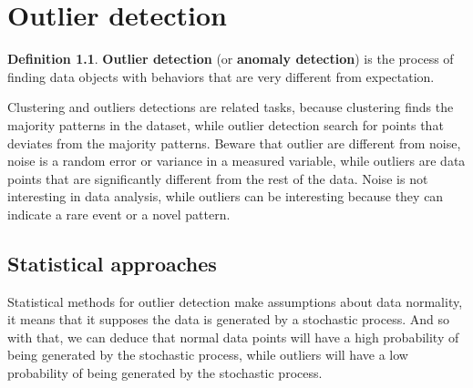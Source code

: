 \documentclass[12pt, openany]{report}
\theoremstyle{definition}
\newtheorem{definition}[thm]{Definition}
\begin{document}
\chapter{Outlier detection}
\begin{definition}
    \textbf{Outlier detection} (or \textbf{anomaly detection}) is the process of finding data objects with behaviors that are very different from expectation.
\end{definition}
Clustering and outliers detections are related tasks, because clustering finds the majority patterns in the dataset, while outlier detection search for points that deviates from the majority patterns. Beware that outlier are different from noise, noise is a random error or variance in a measured variable, while outliers are data points that are significantly different from the rest of the data. Noise is not interesting in data analysis, while outliers can be interesting because they can indicate a rare event or a novel pattern.
\section{Statistical approaches}
Statistical methods for outlier detection make assumptions about data normality, it means that it supposes the data is generated by a stochastic process. And so with that, we can deduce that normal data points will have a high probability of being generated by the stochastic process, while outliers will have a low probability of being generated by the stochastic process.
\end{document}
